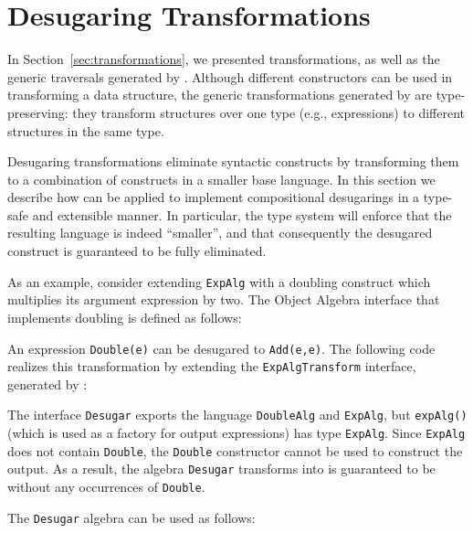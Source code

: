 \section{Desugaring Transformations}\label{sec:heterotrans}


In Section~\ref{sec:transformations}, we presented transformations, as well as the generic traversals generated by \name. Although different constructors can be used in transforming a data structure, the generic transformations generated by \name are type-preserving: they transform structures over one type (e.g., expressions) to different structures in the same type.

Desugaring transformations eliminate syntactic constructs by transforming them to a combination of constructs in a smaller base language. In this section we describe how \Name can be applied to implement compositional desugarings in a type-safe and extensible manner. In particular, the type system will enforce that the resulting language is indeed ``smaller'', and that consequently the desugared construct is guaranteed to be fully eliminated.

As an example, consider extending \lstinline{ExpAlg} with a doubling construct which multiplies its argument expression by two. The Object Algebra interface that implements doubling is defined as follows:


An expression \lstinline{Double(e)} can be desugared to \lstinline{Add(e,e)}.
The following code realizes this transformation by extending the  \lstinline{ExpAlgTransform} interface, generated by \Name:


The interface \lstinline{Desugar} exports the language \lstinline{DoubleAlg} and \lstinline{ExpAlg}, but \lstinline{expAlg()} (which is used as a factory for output expressions) has type \lstinline{ExpAlg}. Since \lstinline{ExpAlg} does not contain \lstinline{Double}, the \lstinline{Double} constructor cannot be used to construct the output. As a result, the algebra \lstinline{Desugar} transforms into is guaranteed to be without any occurrences of \lstinline{Double}.

The \lstinline{Desugar} algebra can be used as follows:

